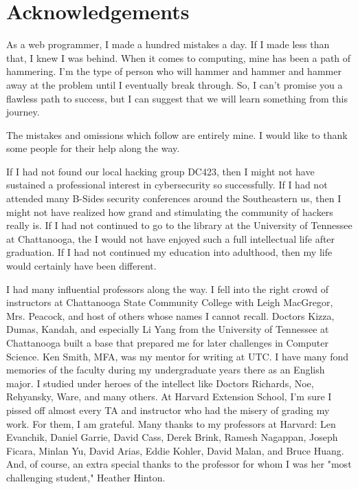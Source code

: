 \chapter*{Acknowledgements}

As a web programmer, I made a hundred mistakes a day. If I made less than that, I knew I was behind.  When it comes to computing, mine has been a path of hammering.  I'm the type of person who will hammer and hammer and hammer away at the problem until I eventually break through.  So, I can't promise you a flawless path to success, but I can suggest that we will learn something from this journey.

The mistakes and omissions which follow are entirely mine.  I would like to thank some people for their help along the way.

If I had not found our local hacking group DC423, then I might not have sustained a professional interest in cybersecurity so successfully.  If I had not attended many B-Sides security conferences around the Southeastern \gls{us}, then I might not have realized how grand and stimulating the community of hackers really is.  If I had not continued to go to the library at the University of Tennessee at Chattanooga, the I would not have enjoyed such a full intellectual life after graduation.  If I had not continued my education into adulthood, then my life would certainly have been different.

I had many influential professors along the way.  I fell into the right crowd of instructors at Chattanooga State Community College with Leigh MacGregor, Mrs. Peacock, and host of others whose names I cannot recall.  Doctors Kizza, Dumas, Kandah, and especially Li Yang from the University of Tennessee at Chattanooga built a base that prepared me for later challenges in Computer Science.  Ken Smith, MFA, was my mentor for writing at UTC.  I have many fond memories of the faculty during my undergraduate years there as an English major.  I studied under heroes of the intellect like Doctors Richards, Noe, Rehyansky, Ware, and many others.  At Harvard Extension School, I'm sure I pissed off almost every TA and instructor who had the misery of grading my work.  For them, I am grateful.  Many thanks to my  professors at Harvard:  Len Evanchik, Daniel Garrie, David Cass, Derek Brink, Ramesh Nagappan, Joseph Ficara, Minlan Yu, David Arias, Eddie Kohler, David Malan, and Bruce Huang.  And, of course, an extra special thanks to the professor for whom I was her "most challenging student," Heather Hinton.

